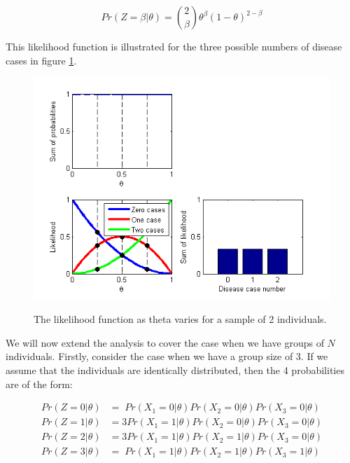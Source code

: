 \documentclass[11pt,fullpage]{book}
\begin{document}
\begin{equation}\label{eq:Likelihood_binomialTwoFull}
Pr(Z=\beta|\theta) = {2 \choose \beta} \theta^\beta (1-\theta)^{2-\beta}
\end{equation}

This likelihood function is illustrated for the three possible numbers of disease cases in figure \ref{fig:Likelihood_binomial}.

\begin{figure}
\centering
\scalebox{0.75} 
{\includegraphics{likelihood_binomial.png}}
\caption{The likelihood function as theta varies for a sample of 2 individuals.}\label{fig:Likelihood_binomial}
\end{figure}

We will now extend the analysis to cover the case when we have groups of $N$ individuals. Firstly, consider the case when we have a group size of 3. If we assume that the individuals are identically distributed, then the 4 probabilities are of the form:

\begin{equation}\label{eq:Likelihood_binomialThreeProbsSimpler}
\begin{align}
Pr(Z = 0|\theta)& = \;Pr(X_1=0|\theta) Pr(X_2=0|\theta)  Pr(X_3=0|\theta)\\
Pr(Z = 1|\theta)& = 3Pr(X_1=1|\theta) Pr(X_2=0|\theta)  Pr(X_3=0|\theta)\\
Pr(Z = 2|\theta)& = 3Pr(X_1=1|\theta) Pr(X_2=1|\theta)  Pr(X_3=0|\theta)\\
Pr(Z = 3|\theta)& = \;Pr(X_1=1|\theta)Pr(X_2=1|\theta) Pr(X_3=1|\theta)
\end{align}
\end{equation}
\end{document}
